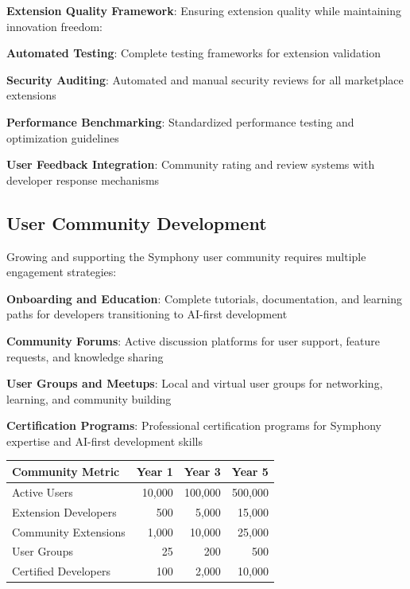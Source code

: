 \textbf{Extension Quality Framework}:
Ensuring extension quality while maintaining innovation freedom:

\begin{compactlist}
    \item \textbf{Automated Testing}: Complete testing frameworks for extension validation
    \item \textbf{Security Auditing}: Automated and manual security reviews for all marketplace extensions
    \item \textbf{Performance Benchmarking}: Standardized performance testing and optimization guidelines
    \item \textbf{User Feedback Integration}: Community rating and review systems with developer response mechanisms
\end{compactlist}

\subsection*{User Community Development}

Growing and supporting the Symphony user community requires multiple engagement strategies:

\begin{expandedlist}
    \item \textbf{Onboarding and Education}: Complete tutorials, documentation, and learning paths for developers transitioning to AI-first development
    \item \textbf{Community Forums}: Active discussion platforms for user support, feature requests, and knowledge sharing
    \item \textbf{User Groups and Meetups}: Local and virtual user groups for networking, learning, and community building
    \item \textbf{Certification Programs}: Professional certification programs for Symphony expertise and AI-first development skills
\end{expandedlist}

\begin{center}
\begin{tabular}{@{}lrrr@{}}
\toprule
\textbf{Community Metric} & \textbf{Year 1} & \textbf{Year 3} & \textbf{Year 5} \\
\midrule
Active Users & 10,000 & 100,000 & 500,000 \\
Extension Developers & 500 & 5,000 & 15,000 \\
Community Extensions & 1,000 & 10,000 & 25,000 \\
User Groups & 25 & 200 & 500 \\
Certified Developers & 100 & 2,000 & 10,000 \\
\bottomrule
\end{tabular}
\end{center}

